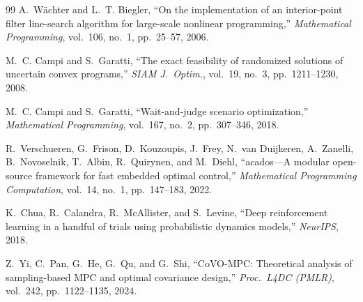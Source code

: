 \documentclass[11pt,onecolumn,a4paper]{article}
\begin{document}
\begin{thebibliography}{99}
A.~W{\"a}chter and L.~T. Biegler, ``On the implementation of an
interior-point filter line-search algorithm for large-scale nonlinear
programming,'' \emph{Mathematical Programming}, vol.~106, no.~1,
pp.~25--57, 2006.

M.~C. Campi and S.~Garatti, ``The exact feasibility of randomized
solutions of uncertain convex programs,'' \emph{SIAM J.\ Optim.},
vol.~19, no.~3, pp.~1211--1230, 2008.

M.~C. Campi and S.~Garatti, ``Wait-and-judge scenario optimization,''
\emph{Mathematical Programming}, vol.~167, no.~2, pp.~307--346, 2018.

R.~Verschueren, G.~Frison, D.~Kouzoupis, J.~Frey, N.~van Duijkeren,
A.~Zanelli, B.~Novoselnik, T.~Albin, R.~Quirynen, and M.~Diehl,
``acados---A modular open-source framework for fast embedded optimal
control,'' \emph{Mathematical Programming Computation}, vol.~14,
no.~1, pp.~147--183, 2022.

K.~Chua, R.~Calandra, R.~McAllister, and S.~Levine, ``Deep reinforcement
learning in a handful of trials using probabilistic dynamics models,''
\emph{NeurIPS}, 2018.

Z.~Yi, C.~Pan, G.~He, G.~Qu, and G.~Shi, ``CoVO-MPC: Theoretical
analysis of sampling-based MPC and optimal covariance design,''
\emph{Proc.\ L4DC (PMLR)}, vol.~242, pp.~1122--1135, 2024.

\end{thebibliography}
\end{document}
